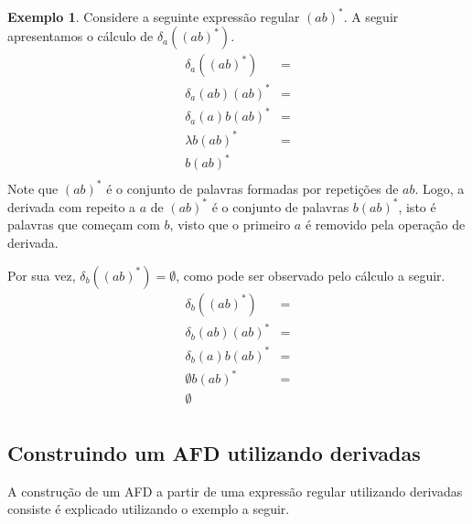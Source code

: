 \documentclass[a4paper]{article}
\theoremstyle{definition}
\newtheorem{Example}{Exemplo}
\begin{document}
  \begin{Example}
    Considere a seguinte expressão regular $(ab)^*$. A seguir apresentamos o
    cálculo de $\delta_a((ab)^*)$.
    \[
      \begin{array}{lc}
      \delta_a((ab)^*) & = \\
      \delta_a(ab)(ab)^* & = \\
      \delta_a(a)b(ab)^* & = \\
      \lambda b(ab)^* & = \\
        b(ab)^* \\
      \end{array}
    \]
    Note que $(ab)^*$ é o conjunto de palavras formadas por repetições de $ab$.
    Logo, a derivada com repeito a $a$ de $(ab)^*$ é o conjunto de palavras
    $b(ab)^*$, isto é palavras que começam com $b$, visto que o primeiro $a$ é
    removido pela operação de derivada.

    Por sua vez, $\delta_b((ab)^*) = \emptyset$, como pode ser observado pelo
    cálculo a seguir.
    \[
      \begin{array}{lc}
      \delta_b((ab)^*) & = \\
      \delta_b(ab)(ab)^* & = \\
      \delta_b(a)b(ab)^* & = \\
      \emptyset b (ab)^* & = \\
        \emptyset\\
        \end{array}
    \]  
  \end{Example}

  \subsection{Construindo um AFD utilizando derivadas}

  A construção de um AFD a partir de uma expressão regular utilizando derivadas
  consiste é explicado utilizando o exemplo a seguir.
\end{document}
